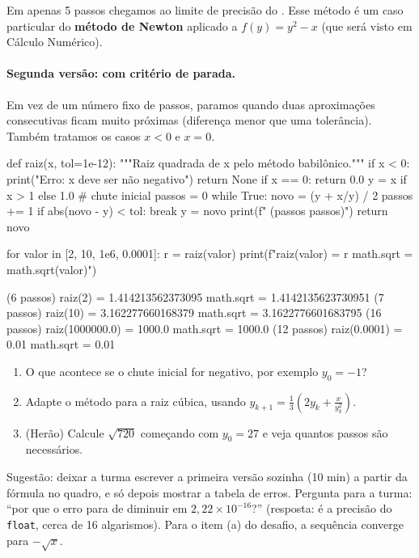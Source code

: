 Em apenas 5 passos chegamos ao limite de precisão do . Esse método é um caso particular do
\textbf{método de Newton} aplicado a $f(y)=y^2-x$ (que será visto em Cálculo Numérico).

\paragraph{Segunda versão: com critério de parada.} Em vez de um número fixo de passos, paramos quando duas
aproximações consecutivas ficam muito próximas (diferença menor que uma tolerância). Também tratamos os casos
$x<0$ e $x=0$.

\begin{entrada}
def raiz(x, tol=1e-12):
    """Raiz quadrada de x pelo método babilônico."""
    if x < 0:
        print("Erro: x deve ser não negativo")
        return None
    if x == 0:
        return 0.0
    y = x if x > 1 else 1.0          # chute inicial
    passos = 0
    while True:
        novo = (y + x/y) / 2
        passos += 1
        if abs(novo - y) < tol:
            break
        y = novo
    print(f"  ({passos} passos)")
    return novo

for valor in [2, 10, 1e6, 0.0001]:
    r = raiz(valor)
    print(f"raiz({valor}) = {r}   math.sqrt = {math.sqrt(valor)}")
\end{entrada}
\begin{saida}
  (6 passos)
raiz(2) = 1.414213562373095   math.sqrt = 1.4142135623730951
  (7 passos)
raiz(10) = 3.162277660168379   math.sqrt = 3.1622776601683795
  (16 passos)
raiz(1000000.0) = 1000.0   math.sqrt = 1000.0
  (12 passos)
raiz(0.0001) = 0.01   math.sqrt = 0.01
\end{saida}

\begin{desafio}
\begin{enumerate}[label=(\alph*)]
  \item O que acontece se o chute inicial for negativo, por exemplo $y_0=-1$?
  \item Adapte o método para a raiz cúbica, usando $y_{k+1}=\frac{1}{3}\left(2y_k+\frac{x}{y_k^2}\right)$.
  \item (Herão) Calcule $\sqrt{720}$ começando com $y_0=27$ e veja quantos passos são necessários.
\end{enumerate}
\end{desafio}

\begin{professor}
Sugestão: deixar a turma escrever a primeira versão sozinha (10 min) a partir da fórmula no quadro, e só depois
mostrar a tabela de erros. Pergunta para a turma: ``por que o erro para de diminuir em $2{,}22\times10^{-16}$?''
(resposta: é a precisão do \texttt{float}, cerca de 16 algarismos). Para o item (a) do desafio, a sequência
converge para $-\sqrt{x}$.
\end{professor}

